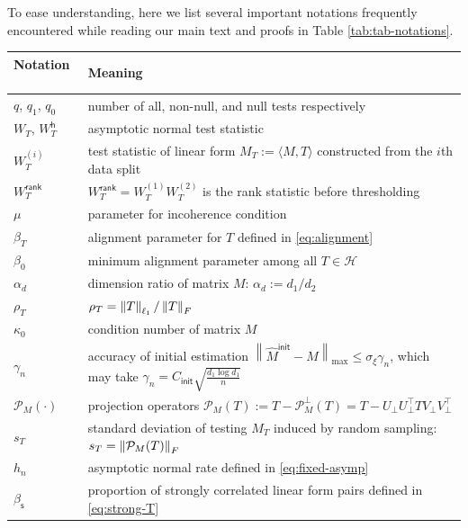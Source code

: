 \documentclass[12pt]{article}
\newcommand{\tF}{{\rm F}}
\newcommand{\norm}[1]{\left\lVert#1\right\rVert}
\newcommand{\cH}{\mathcal{H}}
\newcommand{\cP}{\mathcal{P}}
\newcommand{\init}{{\mathsf{init}}}
\newcommand{\sfh}{{\mathsf{h}}}
\theoremstyle{plain}
\begin{document}
To ease understanding, here we list several important notations frequently encountered while reading our main text and proofs in Table \ref{tab:tab-notations}.
\begin{table}[htbp]
	\centering
	\begin{tabular}{|l|l|}
		\hline\hline
  Notation \ & Meaning \\
  \hline
		$q$, $q_1$, $q_0$ \ & number of all, non-null, and null tests respectively  \\ 
  \hline
  $W_T$,  $W_T^{\sfh}$ \ & asymptotic normal test statistic \\
  \hline
    $W_T^{(i)}$ \ & test statistic of linear form $M_T:=\langle M, T\rangle$ constructed from the $i$th data split \\ 
    \hline
    $W_T^{\mathsf{rank}}$ \ & $W_T^{\mathsf{rank}}=W_{T}^{(1)}W_{T}^{(2)}$ is the  rank statistic before thresholding \\
    \hline
     $\mu$  & parameter for incoherence condition \\ %
     \hline
    $\beta_T$  &  alignment parameter for $T$ defined in \eqref{eq:alignment}\\
     \hline
     $\beta_0$ &  minimum alignment parameter among all $T\in\cH$  \\ %
     \hline
    $\alpha_d$ & dimension ratio of matrix $M$: $\alpha_d:= d_1/d_2$ \\
    \hline
    $\rho_T$& $\rho_T=\norm{T}_{\ell_1}/\norm{T}_{\tF}$ \\
    \hline
    $\kappa_0$ & condition number of matrix $M$ \\
    \hline
    $\gamma_n$  & accuracy of initial estimation $\norm{\widehat{M}^{\mathsf{init}} - M}_{\max} \le  \sigma_\xi \gamma_n$, which may take  $\gamma_n= C_{\init}\sqrt{\frac{ d_1 \log  d_1}{n}}$ \\
    \hline 
    $\cP_M(\cdot)$ & projection operators  $\cP_M^{}(T):= T- \cP_M^{\perp}(T)= T- U_{\perp} U^\top_{\perp} T V_{\perp}V^\top_{\perp}$ \\
    \hline
    $s_T$ & standard deviation of testing $M_T$ induced by random sampling: $s_T=\norm{\cP_M(T) }_\tF$ \\
     \hline
    $h_n$  & asymptotic normal rate defined in \eqref{eq:fixed-asymp} \\
    \hline
    $\beta_{\mathsf{s} }$ &  proportion of strongly correlated linear form pairs defined in \eqref{eq:strong-T} \\

\end{tabular}
\end{table}
\end{document}
